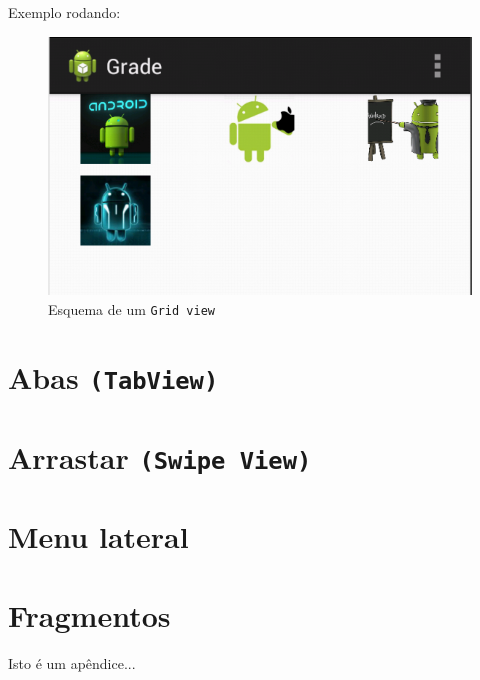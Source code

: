 \documentclass[a4paper,12pt,brazil,doubleside]{book}
\begin{document}
\begin{singlespace}
Exemplo rodando:

\begin{figure}[H]
  \centering
  \includegraphics[width=.475\textwidth]{figuras/design/grade-exemplo1.png}
  \caption{Esquema de um \texttt{Grid view}}
  \label{fig:e}
\end{figure}




\section{Abas \texttt{(TabView)}}
\section{Arrastar \texttt{(Swipe View)}}
\section{Menu lateral}
\section{Fragmentos}

\end{singlespace}




\singlespace
{}
\cleardoublepage
\thispagestyle{empty}
\doublespace


\appendix
{} %

Isto é um apêndice...

\end{document}
